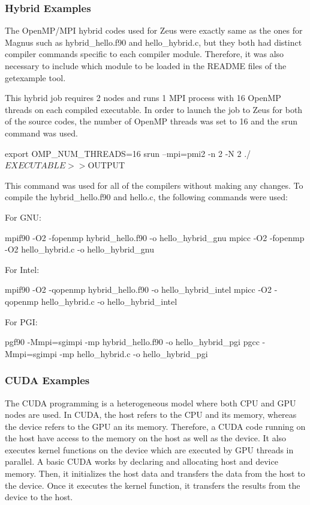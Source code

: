 \documentclass[journal]{IEEEtran}
\begin{document}
\subsubsection{Hybrid Examples}

The OpenMP/MPI hybrid codes used for Zeus were exactly same as the ones for Magnus such as hybrid_hello.f90 and hello_hybrid.c, but they both had
distinct compiler commands specific to each compiler module. Therefore, it was also necessary to include which module to be loaded in the README files
of the getexample tool.

This hybrid job requires 2 nodes and runs 1 MPI process with 16 OpenMP threads on each compiled executable. In order to launch the job to Zeus for both 
of the source codes, the number of OpenMP threads was set to 16 and the srun command was used.

export OMP_NUM_THREADS=16
srun --mpi=pmi2 -n 2 -N 2 ./$EXECUTABLE >> ${OUTPUT}

This command was used for all of the compilers without making any changes. To compile the hybrid_hello.f90 and hello.c, the following commands were used:

For GNU:

mpif90 -O2 -fopenmp hybrid_hello.f90 -o hello_hybrid_gnu
mpicc -O2 -fopenmp -O2 hello_hybrid.c -o hello_hybrid_gnu

For Intel:

mpif90 -O2 -qopenmp hybrid_hello.f90 -o hello_hybrid_intel
mpicc -O2 -qopenmp hello_hybrid.c -o hello_hybrid_intel

For PGI:

pgf90 -Mmpi=sgimpi -mp hybrid_hello.f90 -o hello_hybrid_pgi
pgcc -Mmpi=sgimpi -mp hello_hybrid.c -o hello_hybrid_pgi

\subsubsection{CUDA Examples}

The CUDA programming is a heterogeneous model where both CPU and GPU nodes are used. In CUDA, the host refers to the CPU and its memory, whereas the 
device refers to the GPU an its memory. Therefore, a CUDA code running on the host have access to the memory on the host as well as the device. It also 
executes kernel functions on the device which are executed by GPU threads in parallel. A basic CUDA works by declaring and allocating host and device 
memory. Then, it initializes the host data and transfers the data from the host to the device. Once it executes the kernel function, it transfers the 
results from the device to the host.
\end{document}
